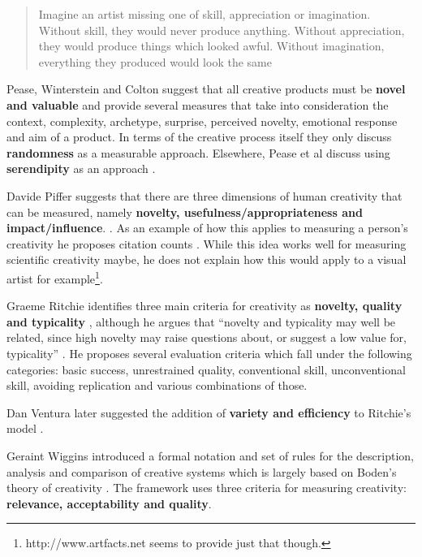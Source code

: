 \begin{quote}
  Imagine an artist missing one of skill, appreciation or imagination. Without skill, they would never produce anything. Without appreciation, they would produce things which looked awful. Without imagination, everything they produced would look the same \citep{Colton2008a}
\end{quote}

Pease, Winterstein and Colton suggest that all creative products must be \textbf{novel and valuable} \citep[p.1]{Pease2001} and provide several measures that take into consideration the context, complexity, archetype, surprise, perceived novelty, emotional response and aim of a product. In terms of the creative process itself they only discuss \textbf{randomness} as a measurable approach. Elsewhere, Pease et al discuss using \textbf{serendipity} as an approach \citep{Pease2013}.

Davide Piffer suggests that there are three dimensions of human creativity that can be measured, namely \textbf{novelty, usefulness/appropriateness and impact/influence}. \citep[p.258-259]{Piffer2012}. As an example of how this applies to measuring a person’s creativity he proposes citation counts \citep[p.261]{Piffer2012}. While this idea works well for measuring scientific creativity maybe, he does not explain how this would apply to a visual artist for example\footnote{http://www.artfacts.net seems to provide just that though.}.

Graeme Ritchie identifies three main criteria for creativity as \textbf{novelty, quality and typicality} \citep[p.72-73]{Ritchie2007}, although he argues that ``novelty and typicality may well be related, since high novelty may raise questions about, or suggest a low value for, typicality'' \citep[p.73]{Ritchie2007} \citep[see also][]{Ritchie2001}. He proposes several evaluation criteria which fall under the following categories: \citep[p.91-92]{Ritchie2007} basic success, unrestrained quality, conventional skill, unconventional skill, avoiding replication and various combinations of those.

Dan Ventura later suggested the addition of \textbf{variety and efficiency} to Ritchie’s model \citep[p.7]{Ventura2008}.

Geraint Wiggins introduced a formal notation and set of rules for the description, analysis and comparison of creative systems \citep{Wiggins2006} which is largely  based on Boden’s theory of creativity \citep{Boden2003}. The framework uses three criteria for measuring creativity: \textbf{relevance, acceptability and quality}.

